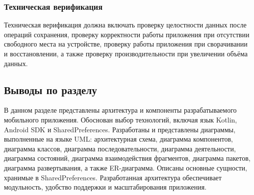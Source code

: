 \subsubsection{Техническая верификация}

Техническая верификация должна включать проверку целостности данных после операций сохранения, проверку корректности работы приложения при отсутствии свободного места на устройстве, проверку работы приложения при сворачивании и восстановлении, а также проверку производительности при увеличении объёма данных.

\subsection{Выводы по разделу}

В данном разделе представлены архитектура и компоненты разрабатываемого мобильного приложения. Обоснован выбор технологий, включая язык Kotlin, Android SDK и SharedPreferences. Разработаны и представлены диаграммы, выполненные на языке UML: архитектурная схема, диаграмма компонентов, диаграмма классов, диаграмма последовательности, диаграмма деятельности, диаграмма состояний, диаграмма взаимодействия фрагментов, диаграмма пакетов, диаграмма развертывания, а также ER-диаграмма. Описаны основные сущности, хранимые в SharedPreferences. Разработанная архитектура обеспечивает модульность, удобство поддержки и масштабирования приложения.